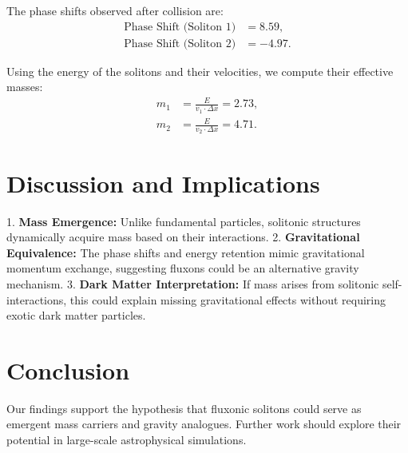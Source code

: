\documentclass{article}
\begin{document}
The phase shifts observed after collision are:
\begin{align*}
    \text{Phase Shift (Soliton 1)} &= 8.59, \\
    \text{Phase Shift (Soliton 2)} &= -4.97.
\end{align*}

Using the energy of the solitons and their velocities, we compute their effective masses:
\begin{align*}
    m_1 &= \frac{E}{v_1 \cdot \Delta x} = 2.73, \\
    m_2 &= \frac{E}{v_2 \cdot \Delta x} = 4.71.
\end{align*}

\section{Discussion and Implications}
1. \textbf{Mass Emergence:} Unlike fundamental particles, solitonic structures dynamically acquire mass based on their interactions.
2. \textbf{Gravitational Equivalence:} The phase shifts and energy retention mimic gravitational momentum exchange, suggesting fluxons could be an alternative gravity mechanism.
3. \textbf{Dark Matter Interpretation:} If mass arises from solitonic self-interactions, this could explain missing gravitational effects without requiring exotic dark matter particles.

\section{Conclusion}
Our findings support the hypothesis that fluxonic solitons could serve as emergent mass carriers and gravity analogues. Further work should explore their potential in large-scale astrophysical simulations.
\end{document}
